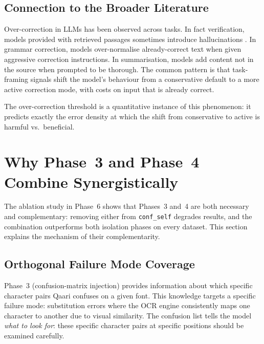 \subsection{Connection to the Broader Literature}
\label{subsec:disc_oc_literature}

Over-correction in LLMs has been observed across tasks. In fact verification,
models provided with retrieved passages sometimes introduce hallucinations
\cite{lewis2020retrieval}. In grammar correction, models over-normalise
already-correct text when given aggressive correction instructions. In
summarisation, models add content not in the source when prompted to be
thorough. The common pattern is that task-framing signals shift the model's
behaviour from a conservative default to a more active correction mode,
with costs on input that is already correct.

The over-correction threshold is a quantitative instance of this phenomenon:
it predicts exactly the error density at which the shift from conservative to
active is harmful vs.\ beneficial.

\section{Why Phase~3 and Phase~4 Combine Synergistically}
\label{sec:disc_complementarity}

The ablation study in Phase~6 shows that Phases~3 and~4 are both necessary
and complementary: removing either from \texttt{conf\_self} degrades results,
and the combination outperforms both isolation phases on every dataset. This
section explains the mechanism of their complementarity.

\subsection{Orthogonal Failure Mode Coverage}
\label{subsec:disc_comp_orthogonal}

Phase~3 (confusion-matrix injection) provides information about which specific
character pairs Qaari confuses on a given font. This knowledge targets a
specific failure mode: substitution errors where the OCR engine consistently
maps one character to another due to visual similarity. The confusion list
tells the model \emph{what to look for}: these specific character pairs at
specific positions should be examined carefully.

